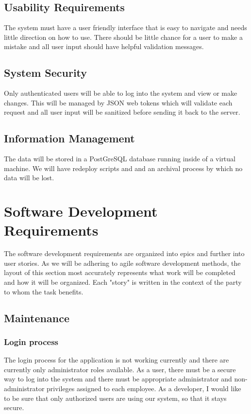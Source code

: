     \subsection{Usability Requirements}
    The system must have a user friendly interface that is easy to navigate and needs little direction on how to use. There should be little chance for a user to make a mistake and all user input should have helpful validation messages.
    \subsection{System Security}
    Only authenticated users will be able to log into the system and view or make changes. This will be managed by JSON web tokens which will validate each request and all user input will be sanitized before sending it back to the server.
    \subsection{Information Management}
    The data will be stored in a PostGreSQL database running inside of a virtual machine. We will have redeploy scripts and and an archival process by which no data will be lost.
\section{Software Development Requirements}
        The software development requirements are organized into epics and further into user stories. As we will be adhering to agile software development methods, the layout of this section most accurately represents what work will be completed and how it will be organized. Each "story" is written in the context of the party to whom the task benefits.
    \subsection{Maintenance}
        \subsubsection{Login process}
        The login process for the application is not working currently and there are currently only administrator roles available. As a user, there must be a secure way to log into the system and there must be appropriate administrator and non-administrator privileges assigned to each employee. As a developer, I would like to be sure that only authorized users are using our system, so that it stays secure. 
